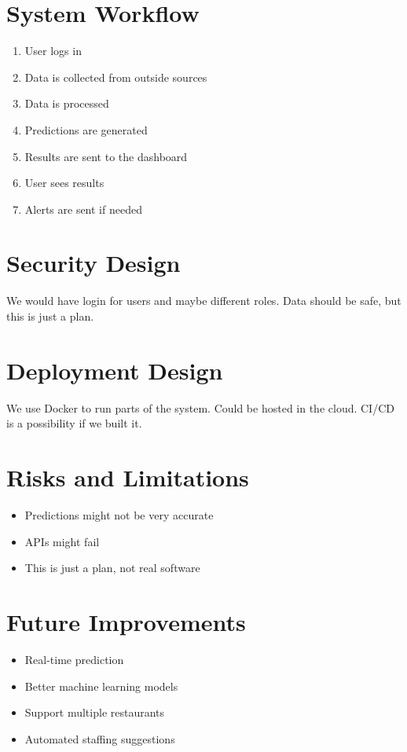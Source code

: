 \documentclass[12pt]{report}
\begin{document}
\section{System Workflow}

\begin{enumerate}
    \item User logs in
    \item Data is collected from outside sources
    \item Data is processed
    \item Predictions are generated
    \item Results are sent to the dashboard
    \item User sees results
    \item Alerts are sent if needed
\end{enumerate}


\section{Security Design}

We would have login for users and maybe different roles. Data should be safe, but this is just a plan.


\section{Deployment Design}

We use Docker to run parts of the system. Could be hosted in the cloud. CI/CD is a possibility if we built it.


\section{Risks and Limitations}

\begin{itemize}
    \item Predictions might not be very accurate
    \item APIs might fail
    \item This is just a plan, not real software
\end{itemize}


\section{Future Improvements}

\begin{itemize}
    \item Real-time prediction
    \item Better machine learning models
    \item Support multiple restaurants
    \item Automated staffing suggestions
\end{itemize}
\end{document}
